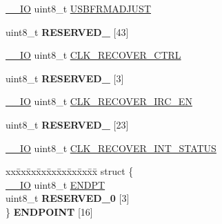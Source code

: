 \begin{DoxyCompactItemize}
\item 
\hyperlink{core__sc300_8h_aec43007d9998a0a0e01faede4133d6be}{\+\_\+\+\_\+\+IO} uint8\+\_\+t \hyperlink{structUSB__Type_a32e51e60eb32b6754162c3e4a9a054e1}{U\+S\+B\+F\+R\+M\+A\+D\+J\+U\+ST}
\item 
uint8\+\_\+t {\bfseries R\+E\+S\+E\+R\+V\+E\+D\+\_} \mbox{[}43\mbox{]}\hypertarget{structUSB__Type_a45513550a651564a2f7a2bbdc1fcaf75}{}\label{structUSB__Type_a45513550a651564a2f7a2bbdc1fcaf75}

\item 
\hyperlink{core__sc300_8h_aec43007d9998a0a0e01faede4133d6be}{\+\_\+\+\_\+\+IO} uint8\+\_\+t \hyperlink{structUSB__Type_ae1fac00c5ed2a5d93d87ab429a2e7f4f}{C\+L\+K\+\_\+\+R\+E\+C\+O\+V\+E\+R\+\_\+\+C\+T\+RL}
\item 
uint8\+\_\+t {\bfseries R\+E\+S\+E\+R\+V\+E\+D\+\_} \mbox{[}3\mbox{]}\hypertarget{structUSB__Type_a9a295983106b1834060cc4fe14d06d75}{}\label{structUSB__Type_a9a295983106b1834060cc4fe14d06d75}

\item 
\hyperlink{core__sc300_8h_aec43007d9998a0a0e01faede4133d6be}{\+\_\+\+\_\+\+IO} uint8\+\_\+t \hyperlink{structUSB__Type_a80fb0714f5079cacf75a9b8d1e8bd4ed}{C\+L\+K\+\_\+\+R\+E\+C\+O\+V\+E\+R\+\_\+\+I\+R\+C\+\_\+\+EN}
\item 
uint8\+\_\+t {\bfseries R\+E\+S\+E\+R\+V\+E\+D\+\_} \mbox{[}23\mbox{]}\hypertarget{structUSB__Type_a91dbe08f46a1d788ee9068bf1b610388}{}\label{structUSB__Type_a91dbe08f46a1d788ee9068bf1b610388}

\item 
\hyperlink{core__sc300_8h_aec43007d9998a0a0e01faede4133d6be}{\+\_\+\+\_\+\+IO} uint8\+\_\+t \hyperlink{structUSB__Type_a4029c33c535571c3fd55577bc1c37cc4}{C\+L\+K\+\_\+\+R\+E\+C\+O\+V\+E\+R\+\_\+\+I\+N\+T\+\_\+\+S\+T\+A\+T\+US}
\item 
\begin{tabbing}
xx\=xx\=xx\=xx\=xx\=xx\=xx\=xx\=xx\=\kill
struct \{\\
\>\hyperlink{core__sc300_8h_aec43007d9998a0a0e01faede4133d6be}{\_\_IO} uint8\_t \hyperlink{structUSB__Type_ae31e5076afa4cee3a94c6b57b374426a}{ENDPT}\\
\>uint8\_t {\bfseries RESERVED\_0} \mbox{[}3\mbox{]}\\
\} {\bfseries ENDPOINT} \mbox{[}16\mbox{]}\hypertarget{structUSB__Type_aa31ddf0c100509bd7158b27c34d6e106}{}\label{structUSB__Type_aa31ddf0c100509bd7158b27c34d6e106}
\\

\end{tabbing}\end{DoxyCompactItemize}


